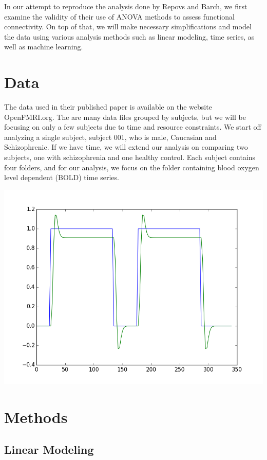 \documentclass[11pt]{article} \usepackage{graphicx} \graphicspath{ {images/} }
\begin{document}
In our attempt to reproduce the analysis done by Repovs and Barch, we first
examine the validity of their use of ANOVA methods to assess functional
connectivity. On top of that, we will make necessary simplifications and model
the data using various analysis methods such as linear modeling, time series,
as well as machine learning. 


\section{Data}

The data used in their published paper is available on the website
OpenFMRI.org. The are many data files grouped by subjects, but we will be
focusing on only a few subjects due to time and resource constraints. We start
off analyzing a single subject, subject 001, who is male, Caucasian and
Schizophrenic. If we have time, we will extend our analysis on comparing two
subjects, one with schizophrenia and one healthy control. Each subject contains
four folders, and for our analysis, we focus on the folder containing blood
oxygen level dependent (BOLD) time series.  

\includegraphics{task001_run001_conv005}

\section{Methods} \subsection{Linear Modeling} 
\end{document}
